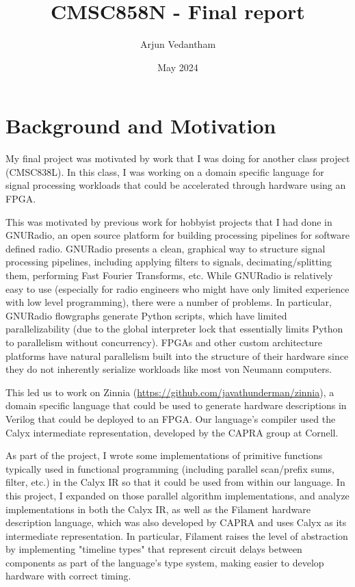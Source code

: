 \documentclass[12pt]{article}
\title{CMSC858N - Final report}
\author{Arjun Vedantham}
\date{May 2024}
\begin{document}
\maketitle
\section{Background and Motivation}
My final project was motivated by work that I was doing for another class project (CMSC838L).
In this class, I was working on a domain specific language for signal processing workloads
that could be accelerated through hardware using an FPGA.

This was motivated by previous work for hobbyist projects that I had done in GNURadio, an open source
platform for building processing pipelines for software defined radio. GNURadio presents a clean,
graphical way to structure signal processing pipelines, including applying filters to signals,
decimating/splitting them, performing Fast Fourier Transforms, etc. While GNURadio is relatively easy
to use (especially for radio engineers who might have only limited experience with low level programming),
there were a number of problems. In particular, GNURadio flowgraphs generate Python scripts, which have limited
parallelizability (due to the global interpreter lock that essentially limits Python to parallelism without
concurrency). FPGAs and other custom architecture platforms have natural parallelism built into the structure
of their hardware since they do not inherently serialize workloads like most von Neumann computers.

This led us to work on Zinnia (\url{https://github.com/javathunderman/zinnia}), a domain specific language that could be used to generate
hardware descriptions in Verilog that could be deployed to an FPGA. Our language's compiler used
the Calyx intermediate representation, developed by the CAPRA group at Cornell.

As part of the project, I wrote some implementations of primitive functions typically used in functional
programming (including parallel scan/prefix sums, filter, etc.) in the Calyx IR so that it could be used from within our language.
In this project, I expanded on those parallel algorithm implementations, and analyze implementations
in both the Calyx IR\cite{nigam_compiler_2021}, as well as the Filament hardware description language\cite{nigam_modular_2023}, which was also developed by CAPRA
and uses Calyx as its intermediate representation. In particular, Filament raises the level of abstraction by
implementing "timeline types" that represent circuit delays between components as part of the language's
type system, making easier to develop hardware with correct timing.
\end{document}
